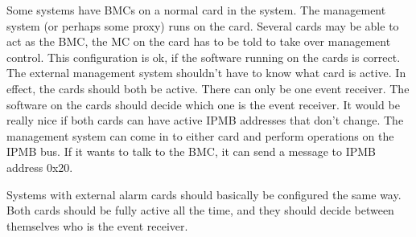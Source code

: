 Some systems have BMCs on a normal card in the system.  The management
system (or perhaps some proxy) runs on the card.  Several cards may be
able to act as the BMC, the MC on the card has to be told to take over
management control.  This configuration is ok, if the software running
on the cards is correct.  The external management system shouldn't
have to know what card is active.  In effect, the cards should both be
active.  There can only be one event receiver.  The software on the
cards should decide which one is the event receiver.  It would be
really nice if both cards can have active IPMB addresses that don't
change.  The management system can come in to either card and perform
operations on the IPMB bus.  If it wants to talk to the BMC, it can
send a message to IPMB address 0x20.

Systems with external alarm cards should basically be configured the
same way.  Both cards should be fully active all the time, and they
should decide between themselves who is the event receiver.
